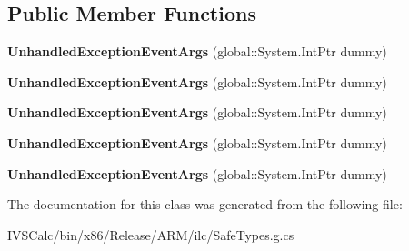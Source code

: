 \subsection*{Public Member Functions}
\begin{DoxyCompactItemize}
\item 
\mbox{\label{class_windows_1_1_u_i_1_1_xaml_1_1_unhandled_exception_event_args_aad7b997f9dc332dd7455ba197d71fc8d}} 
{\bfseries Unhandled\+Exception\+Event\+Args} (global\+::\+System.\+Int\+Ptr dummy)
\item 
\mbox{\label{class_windows_1_1_u_i_1_1_xaml_1_1_unhandled_exception_event_args_aad7b997f9dc332dd7455ba197d71fc8d}} 
{\bfseries Unhandled\+Exception\+Event\+Args} (global\+::\+System.\+Int\+Ptr dummy)
\item 
\mbox{\label{class_windows_1_1_u_i_1_1_xaml_1_1_unhandled_exception_event_args_aad7b997f9dc332dd7455ba197d71fc8d}} 
{\bfseries Unhandled\+Exception\+Event\+Args} (global\+::\+System.\+Int\+Ptr dummy)
\item 
\mbox{\label{class_windows_1_1_u_i_1_1_xaml_1_1_unhandled_exception_event_args_aad7b997f9dc332dd7455ba197d71fc8d}} 
{\bfseries Unhandled\+Exception\+Event\+Args} (global\+::\+System.\+Int\+Ptr dummy)
\item 
\mbox{\label{class_windows_1_1_u_i_1_1_xaml_1_1_unhandled_exception_event_args_aad7b997f9dc332dd7455ba197d71fc8d}} 
{\bfseries Unhandled\+Exception\+Event\+Args} (global\+::\+System.\+Int\+Ptr dummy)
\end{DoxyCompactItemize}


The documentation for this class was generated from the following file\+:\begin{DoxyCompactItemize}
\item 
I\+V\+S\+Calc/bin/x86/\+Release/\+A\+R\+M/ilc/Safe\+Types.\+g.\+cs\end{DoxyCompactItemize}
